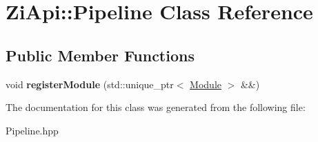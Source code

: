 \hypertarget{classZiApi_1_1Pipeline}{}\section{Zi\+Api\+::Pipeline Class Reference}
\label{classZiApi_1_1Pipeline}
\subsection*{Public Member Functions}
\begin{DoxyCompactItemize}
\item 
\mbox{\label{classZiApi_1_1Pipeline_a6f89797290dfa5c269f46952e9bc9c71}} 
void {\bfseries register\+Module} (std\+::unique\+\_\+ptr$<$ \mbox{\hyperlink{classZiApi_1_1Module}{Module}} $>$ \&\&)
\end{DoxyCompactItemize}


The documentation for this class was generated from the following file\+:\begin{DoxyCompactItemize}
\item 
Pipeline.\+hpp\end{DoxyCompactItemize}
